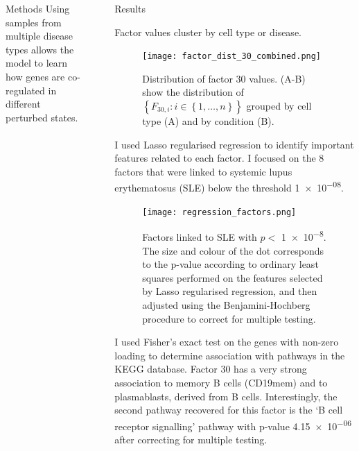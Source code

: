 \documentclass[final]{beamer}
\newlength{\sepwid}
\newlength{\onecolwid}
\begin{document}
\begin{frame}[t]
\begin{columns}[t]
\begin{column}{\onecolwid}
\begin{block}{Methods}
Using samples from multiple disease types allows the model to learn how genes are co-regulated in different perturbed states.

\end{block}




\end{column} %

\begin{column}{\sepwid}\end{column} %

\begin{column}{\onecolwid} %


\begin{block}{Results}

Factor values cluster by cell type or disease.

\begin{figure}[h]
\centering
\texttt{[image: factor\_dist\_30\_combined.png]}
\caption{Distribution of factor 30 values. (A-B) show the distribution of $\left\lbrace F_{30,i} : i \in \left\lbrace 1 , \dots, n \right\rbrace \right\rbrace
$ grouped by cell type (A) and by condition (B).}
\label{fig:dist_30}
\end{figure}

I used Lasso regularised regression to identify important features related to each factor. I focused on the 8 factors that were linked to systemic lupus erythematosus (SLE) below the threshold \num{1e-08}.

\begin{figure}[h]
\centering
\texttt{[image: regression\_factors.png]}
\caption{Factors linked to SLE with $p<$ \num{1e-8}. The size and colour of the dot corresponds to the p-value according to ordinary least squares performed on the features selected by Lasso regularised regression, and then adjusted using the Benjamini-Hochberg procedure to correct for multiple testing.}
\label{fig:regression_factors_SLE}
\end{figure}

I used Fisher's exact test on the genes with non-zero loading to determine association with pathways in the KEGG database. Factor 30 has a very strong association to memory B cells (CD19mem) and to plasmablasts, derived from B cells. Interestingly, the second pathway recovered for this factor is the `B cell receptor signalling' pathway with p-value \num{4.15e-06} after correcting for multiple testing.


\end{block}
\end{column}
\end{columns}
\end{frame}
\end{document}
